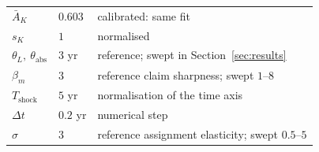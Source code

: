 \documentclass[12pt, a4paper]{article}
\begin{document}
\begin{table}[tbp]
\begin{tabular}{llp{7.6cm}}
$\bar A_K$ & $0.603$ & calibrated: same fit \\
$s_K$ & $1$ & normalised \\
$\theta_L,\ \theta_{\text{abs}}$ & $3$ yr & reference; swept in
Section~\ref{sec:results} \\
$\beta_m$ & $3$ & reference claim sharpness; swept $1$--$8$ \\
$T_{\text{shock}}$ & $5$ yr & normalisation of the time axis \\
$\Delta t$ & $0.2$ yr & numerical step \\
$\sigma$ & $3$ & reference assignment elasticity; swept $0.5$--$5$ \\
\bottomrule
\end{tabular}
\end{table}

\printbibliography
\end{document}
